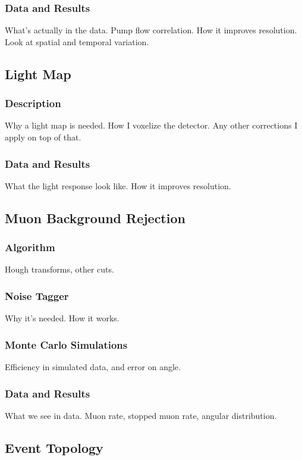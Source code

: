 \documentclass[12pt,letterpaper,onecolumn]{article}
\begin{document}
\subsubsection{Data and Results}
What's actually in the data. Pump flow correlation. How it improves resolution. Look at spatial and temporal variation.

\subsection{Light Map}

\subsubsection{Description}
Why a light map is needed. How I voxelize the detector. Any other corrections I apply on top of that.

\subsubsection{Data and Results}
What the light response look like. How it improves resolution.

\subsection{Muon Background Rejection}

\subsubsection{Algorithm}
Hough transforms, other cuts.

\subsubsection{Noise Tagger}
Why it's needed. How it works.

\subsubsection{Monte Carlo Simulations}
Efficiency in simulated data, and error on angle.

\subsubsection{Data and Results}
What we see in data. Muon rate, stopped muon rate, angular distribution.

\subsection{Event Topology}
\end{document}
